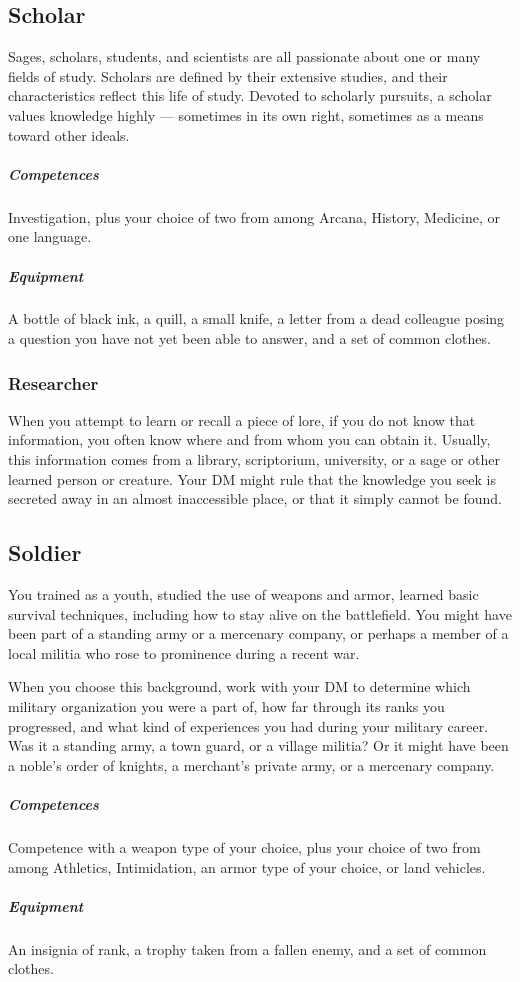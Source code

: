 \subsection*{Scholar} \label{ssec::scholar}
    Sages, scholars, students, and scientists are all passionate about one or many fields of study.
    Scholars are defined by their extensive studies, and their characteristics reflect this life of study.
    Devoted to scholarly pursuits, a scholar values knowledge highly --- sometimes in its own right, sometimes as a means toward other ideals.
    \subparagraph{Competences} Investigation, plus your choice of two from among Arcana, History, Medicine, or one language.
    \subparagraph{Equipment} A bottle of black ink, a quill, a small knife, a letter from a dead colleague posing a question you have not yet been able to answer, and a set of common clothes.
    \subsubsection{Researcher} \label{feat::researcher}
        When you attempt to learn or recall a piece of lore, if you do not know that information, you often know where and from whom you can obtain it.
        Usually, this information comes from a library, scriptorium, university, or a sage or other learned person or creature.
        Your DM might rule that the knowledge you seek is secreted away in an almost inaccessible place, or that it simply cannot be found.

\subsection*{Soldier} \label{ssec::soldier}
    You trained as a youth, studied the use of weapons and armor, learned basic survival techniques, including how to stay alive on the battlefield.
    You might have been part of a standing army or a mercenary company, or perhaps a member of a local militia who rose to prominence during a recent war.

    When you choose this background, work with your DM to determine which military organization you were a part of, how far through its ranks you progressed, and what kind of experiences you had during your military career.
    Was it a standing army, a town guard, or a village militia?
    Or it might have been a noble's order of knights, a merchant's private army, or a mercenary company.
    \subparagraph{Competences} Competence with a weapon type of your choice, plus your choice of two from among Athletics, Intimidation, an armor type of your choice, or land vehicles.
    \subparagraph{Equipment} An insignia of rank, a trophy taken from a fallen enemy, and a set of common clothes.
